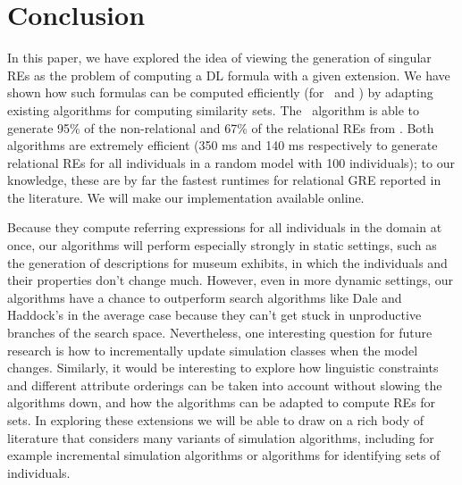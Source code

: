 \section{Conclusion} \label{sec:conclusion}

In this paper, we have explored the idea of viewing the generation of
singular REs as the problem of computing a DL formula with a given
extension.  We have shown how such formulas can be computed
efficiently (for \alc\ and \el) by adapting existing algorithms for
computing similarity sets.  The \el\ algorithm is able to generate
95\% of the non-relational and 67\% of the relational REs from
.  Both algorithms
are extremely efficient (350 ms and 140 ms respectively to generate
relational REs for all individuals in a random model with 100
individuals); to our knowledge, these are by far the fastest runtimes
for relational GRE reported in the literature.  We will make our
implementation available online.

Because they compute referring expressions for all individuals in the
domain at once, our algorithms will perform especially strongly in
static settings, such as the generation of descriptions for museum
exhibits, in which the individuals and their properties don't change
much.  However, even in more dynamic settings, our algorithms have a
chance to outperform search algorithms like Dale and Haddock's in the
average case because they can't get stuck in unproductive branches of
the search space. Nevertheless, one interesting question for future
research is how to incrementally update simulation classes when the
model changes. Similarly, it would be interesting to explore how
linguistic constraints and different attribute orderings can be taken
into account without slowing the algorithms down, and how the
algorithms can be adapted to compute REs for sets. In exploring these
extensions we will be able to draw on a rich body of literature that
considers many variants of simulation algorithms, including for
example incremental simulation algorithms or algorithms for
identifying sets of individuals.









